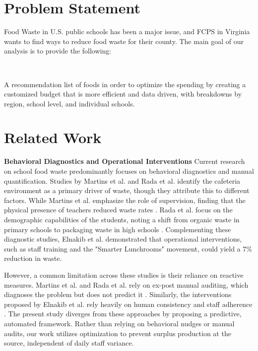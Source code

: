 \documentclass{scrartcl}
\begin{document}
\section{Problem Statement}

Food Waste in U.S. public schools has been a major issue, and FCPS in Virginia wants to find ways to reduce food waste for their county. The main goal of our analysis is to provide the following: 

\

A recommendation list of foods in order to optimize the spending by creating a customized budget that is more efficient and data driven, with breakdowns by region, school level, and individual schools.



\section{Related Work}

\textbf{Behavioral Diagnostics and Operational Interventions}
Current research on school food waste predominantly focuses on behavioral diagnostics and manual quantification. Studies by Martins et al. \cite{factors} and Rada et al. \cite{rada} identify the cafeteria environment as a primary driver of waste, though they attribute this to different factors. While Martins et al. emphasize the role of supervision, finding that the physical presence of teachers reduced waste rates \cite{factors}. Rada et al. focus on the demographic capabilities of the students, noting a shift from organic waste in primary schools to packaging waste in high schools \cite{rada}. Complementing these diagnostic studies, Elnakib et al. \cite{elnakib} demonstrated that operational interventions, such as staff training and the "Smarter Lunchrooms" movement, could yield a 7\% reduction in waste.

However, a common limitation across these studies is their reliance on reactive measures. Martins et al. and Rada et al. rely on ex-post manual auditing, which diagnoses the problem but does not predict it \cite{factors, rada}. Similarly, the interventions proposed by Elnakib et al. rely heavily on human consistency and staff adherence \cite{elnakib}. The present study diverges from these approaches by proposing a predictive, automated framework. Rather than relying on behavioral nudges or manual audits, our work utilizes optimization to prevent surplus production at the source, independent of daily staff variance.
\end{document}

